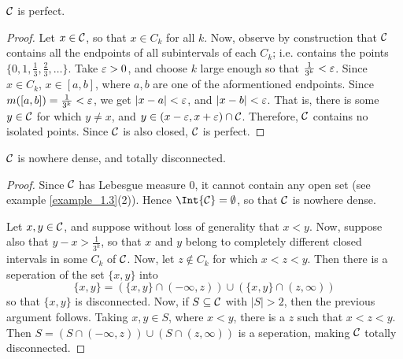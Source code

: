 \begin{corollary}
    $\mathcal{C}$ is perfect.
\end{corollary}
\begin{proof}
    Let $x \in \mathcal{C}$, so that $x \in C_k$ for all $k$. Now, observe by
    construction that $\mathcal{C}$ contains all the endpoints of all subintervals of
    each $C_k$; i.e. contains the points $\{0, 1, \frac{1}{3}, \frac{2}{3},
    \dots\}$. Take $\varepsilon>0$, and choose $k$ large enough so that
    $\frac{1}{3^k}<\varepsilon$. Since $x \in C_k$, $x \in [a,b]$, where $a,b$ are one of
    the aformentioned endpoints. Since $m([a,b])=\frac{1}{3^k}<\varepsilon$, we get
    $|x-a|<\varepsilon$, and $|x-b|<\varepsilon$. That is, there is some  $y \in \mathcal{C}$ for which $y
    \neq x$, and $y \in (x-\varepsilon,x+\varepsilon) \cap \mathcal{C}$. Therefore, $\mathcal{C}$ contains no
    isolated points. Since $\mathcal{C}$ is also closed,  $\mathcal{C}$ is perfect.
\end{proof}
\begin{corollary}
    $\mathcal{C}$ is nowhere dense, and  totally disconnected.
\end{corollary}
\begin{proof}
    Since $\mathcal{C}$ has Lebesgue measure $0$, it cannot contain any open set (see
    example \ref{example_1.3}(2)). Hence $\Int{\Cc}=\emptyset$, so that $\mathcal{C}$ is
    nowhere dense.

    Let $x,y \in \mathcal{C}$, and suppose without loss of generality that $x<y$. Now,
    suppose also that $y-x>\frac{1}{3^k}$, so that $x$ and $y$ belong to
    completely different closed intervals in some $C_k$ of $\mathcal{C}$. Now, let $z
    \not\in C_k$ for which $x<z<y$. Then there is a seperation of the set
    $\{x,y\}$ into
    \begin{equation*}
        \{x,y\}=(\{x,y\} \cap (-\infty, z)) \cup (\{x,y\} \cap (z,\infty))
    \end{equation*}
    so that $\{x,y\}$ is disconnected. Now, if $S \subseteq \mathcal{C}$ with $|S|>2$,
    then the previous argument follows. Taking $x,y \in S$, where $x<y$, there
    is a  $z$ such that $x<z<y$. Then $S=(S \cap (-\infty, z)) \cup (S \cap
    (z,\infty))$ is a seperation, making $\mathcal{C}$ totally disconnected.
\end{proof}


